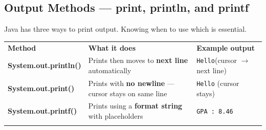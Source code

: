 \documentclass[12pt,a4paper,oneside]{book}
\renewcommand{\arraystretch}{1.35}
\begin{document}
\subsection{Output Methods --- print, println, and printf}

Java has three ways to print output. Knowing when to use which is essential.

\begin{center}
\renewcommand{\arraystretch}{1.55}
{\small
\begin{tabular}{
  !{\color{myblue}\vrule width 1.2pt}
  >{\bfseries\ttfamily}p{3.9cm}
  !{\color{myblue!40}\vrule}
  p{4.6cm}
  !{\color{myblue!40}\vrule}
  p{3.0cm}
  !{\color{myblue}\vrule width 1.2pt}
}
\hline
{}
\color{white}\textbf{Method} &
\color{white}\textbf{What it does} &
\color{white}\textbf{Example output}\\
\hline
{}
System.out.\newline println() & Prints then moves to \textbf{next line} automatically & \texttt{Hello}\newline(cursor $\to$ next line)\\
System.out.print() & Prints with \textbf{no newline} --- cursor stays on same line & \texttt{Hello} (cursor stays)\\
System.out.printf() & Prints using a \textbf{format string} with placeholders & \texttt{GPA : 8.46}\\
\hline
\end{tabular}}
\end{center}
\end{document}
